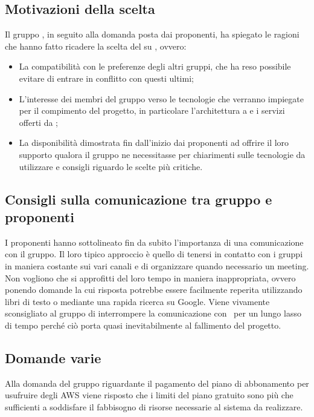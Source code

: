 \subsection{Motivazioni della scelta}
Il gruppo {\Gruppo}, in seguito alla domanda posta dai proponenti, ha spiegato le ragioni che hanno fatto ricadere la scelta del  su {\NomeProgetto}, ovvero:
\begin{itemize}
	\item La compatibilità con le preferenze degli altri gruppi, che ha reso possibile evitare di entrare in conflitto con questi ultimi;
	\item L'interesse dei membri del gruppo verso le tecnologie che verranno impiegate per il compimento del progetto, in particolare l'architettura a  e i servizi offerti da ;
	\item La disponibilità dimostrata fin dall'inizio dai proponenti ad offrire il loro supporto qualora il gruppo ne necessitasse per chiarimenti sulle tecnologie da utilizzare e consigli riguardo le scelte più critiche.
\end{itemize}
\subsection{Consigli sulla comunicazione tra gruppo e proponenti}
I proponenti hanno sottolineato fin da subito l'importanza di una  comunicazione con il gruppo. Il loro tipico approccio è quello di tenersi in contatto con i gruppi in maniera costante sui vari canali  e di organizzare quando necessario un meeting.
Non vogliono che si approfitti del loro tempo in maniera inappropriata, ovvero ponendo domande la cui risposta potrebbe essere facilmente reperita utilizzando libri di testo o mediante una rapida ricerca su Google.
Viene vivamente sconsigliato al gruppo di interrompere la comunicazione con \Proponente\ per un lungo lasso di tempo perché ciò porta quasi inevitabilmente al fallimento del progetto.
\subsection{Domande varie}
Alla domanda del gruppo riguardante il pagamento del piano di abbonamento per usufruire degli AWS viene risposto che i limiti del piano gratuito sono più che sufficienti a soddisfare il fabbisogno di risorse necessarie al sistema da realizzare.

